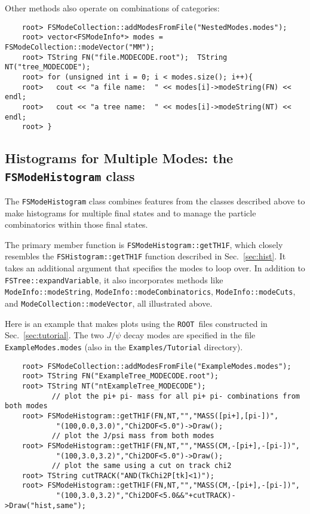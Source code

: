 \documentclass[11pt]{article}
\newcommand{\ROOT}{{\tt ROOT}}
\begin{document}
Other methods also operate on combinations of categories:
\begin{verbatim}
    root> FSModeCollection::addModesFromFile("NestedModes.modes");
    root> vector<FSModeInfo*> modes = FSModeCollection::modeVector("MM");
    root> TString FN("file.MODECODE.root");  TString NT("tree_MODECODE");
    root> for (unsigned int i = 0; i < modes.size(); i++){ 
    root>   cout << "a file name:  " << modes[i]->modeString(FN) << endl;
    root>   cout << "a tree name:  " << modes[i]->modeString(NT) << endl;
    root> }
\end{verbatim}


\subsection{Histograms for Multiple Modes: the {\tt FSModeHistogram} class}
\label{sec:modehist}

The {\tt FSModeHistogram} class combines features from the classes described above to make histograms for multiple final states and to manage the particle combinatorics within those final states.

The primary member function is {\tt FSModeHistogram::getTH1F}, which closely resembles the {\tt FSHistogram::getTH1F} function described in Sec.~\ref{sec:hist}.  It takes an additional argument that specifies the modes to loop over.  In addition to {\tt FSTree::expandVariable}, it also incorporates methods like {\tt ModeInfo::modeString}, {\tt ModeInfo::modeCombinatorics}, {\tt ModeInfo::modeCuts}, and {\tt ModeCollection::modeVector}, all illustrated above. 

Here is an example that makes plots using the \ROOT\ files constructed in Sec.~\ref{sec:tutorial}.  The two $J/\psi$ decay modes are specified in the file {\tt ExampleModes.modes} (also in the {\tt Examples/Tutorial} directory).  
\begin{verbatim}
    root> FSModeCollection::addModesFromFile("ExampleModes.modes");
    root> TString FN("ExampleTree_MODECODE.root");  
    root> TString NT("ntExampleTree_MODECODE");
           // plot the pi+ pi- mass for all pi+ pi- combinations from both modes  
    root> FSModeHistogram::getTH1F(FN,NT,"","MASS([pi+],[pi-])",
            "(100,0.0,3.0)","Chi2DOF<5.0")->Draw();
           // plot the J/psi mass from both modes  
    root> FSModeHistogram::getTH1F(FN,NT,"","MASS(CM,-[pi+],-[pi-])",
            "(100,3.0,3.2)","Chi2DOF<5.0")->Draw();
           // plot the same using a cut on track chi2
    root> TString cutTRACK("AND(TkChi2P[tk]<1)");
    root> FSModeHistogram::getTH1F(FN,NT,"","MASS(CM,-[pi+],-[pi-])",
            "(100,3.0,3.2)","Chi2DOF<5.0&&"+cutTRACK)->Draw("hist,same");
\end{verbatim}
\end{document}
